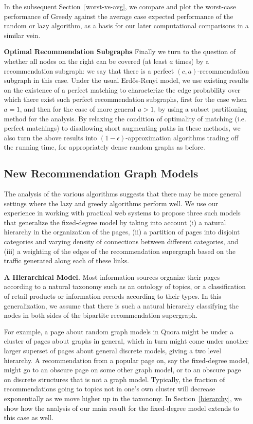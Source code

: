 In the subsequent Section~\ref{worst-vs-avg}, we compare and plot the worst-case performance of Greedy against the average case expected performance of the random or lazy algorithm, as a basis for our later computational comparisons in a similar vein.

{\bf Optimal Recommendation Subgraphs}
Finally we turn to the question of whether all nodes on the right can be covered (at least $a$ times) by a recommendation subgraph: we say that there is a perfect $(c,a)$-recommendation subgraph in this case. Under the usual Erd\"os-Renyi model, we use existing results on the existence of a perfect matching to characterize the edge probability over which there exist such perfect recommendation subgraphs, first for the case when $a=1$, and then for the case of more general $a > 1$, by using a subset partitioning method for the analysis. By relaxing the condition of optimality of matching (i.e. perfect matchings) to disallowing short augmenting paths in these methods, we also turn the above results into $(1-\epsilon)$-approximation algorithms trading off the running time, for appropriately dense random graphs as before.

\subsection{New Recommendation Graph Models}
The analysis of the various algorithms suggests that there may be more general settings where the lazy and greedy algorithms perform well. We use our experience in working with practical web systems to propose three such models that generalize the fixed-degree model by taking into account (i) a natural hierarchy in the organization of the pages, (ii) a partition of pages into disjoint categories and varying density of connections between different categories, and (iii) a weighting of the edges of the recommendation supergraph based on the traffic generated along each of these links. 

{\bf A Hierarchical Model.}  Most information sources organize their pages according to a natural taxonomy such as an ontology of topics, or a classification of retail products or information records according to their types. In this generalization, we assume that there is such a natural hierarchy classifying the nodes in both sides of the bipartite recommendation supergraph. 


For example, a page about random graph models in Quora might be under a cluster of pages about graphs in general, which in turn might come under another larger superset of pages about general discrete models, giving a two level hierarchy. A recommendation from a popular page on, say the fixed-degree model, might go to an obscure page on some other graph model, or to an obscure page on discrete structures that is not a graph model. Typically, the fraction of recommendations going to topics not in one's own cluster will decrease exponentially as we move higher up in the taxonomy. In Section~\ref{hierarchy}, we show how the analysis of our main result for the fixed-degree model extends to this case as well.  

